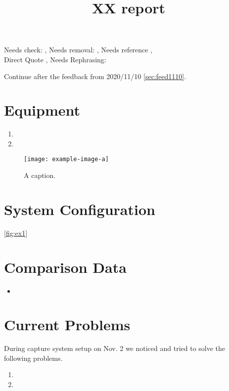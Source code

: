 \documentclass{foxelas_report}
\title{XX report}
\begin{document}
\setcounter{page}{1}

\maketitle

Needs check: \chk{ } , Needs removal: \rmv{ }, Needs reference \rf , \\
Direct Quote \dq{} , Needs Rephrasing: \reph{}

\medskip 
Continue after the feedback from 2020/11/10 \autoref{sec:feed1110}. 

\section{Equipment}
\begin{enumerate}
\item \blindtext 
\item \blindtext 

\end{enumerate}

\begin{figure}[H]
\begin{center}
\texttt{[image: example-image-a]}
\caption{A caption.}
\label{fig:ex1}
\end{center}
\end{figure}


\section{System Configuration}
\blindtext \autoref{fig:ex1} \blindtext 

\section{Comparison Data}
\begin{itemize}
\item \blindtext 
\end{itemize}

\section{Current Problems}
During capture system setup on Nov. 2 we noticed and tried to solve the following problems. 

\begin{enumerate}
\item \blindtext 
\item \blindtext 
\end{enumerate}
\end{document}
